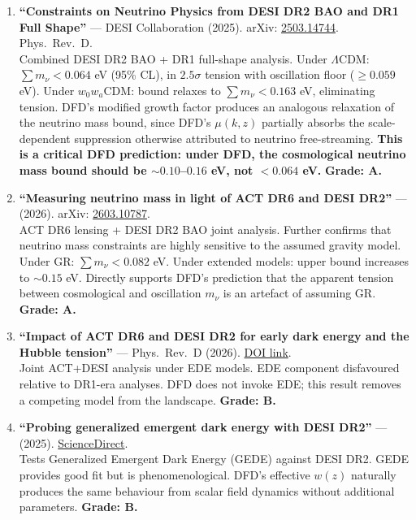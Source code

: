 \documentclass[11pt,a4paper]{article}
\begin{document}
\begin{enumerate}
\item \textbf{``Constraints on Neutrino Physics from DESI DR2 BAO and DR1 Full Shape''} --- DESI Collaboration (2025). arXiv: \href{https://arxiv.org/abs/2503.14744}{2503.14744}. Phys.\ Rev.\ D.\\
Combined DESI DR2 BAO + DR1 full-shape analysis. Under $\Lambda$CDM: $\sum m_\nu < 0.064$ eV (95\% CL), in $2.5\sigma$ tension with oscillation floor ($\geq 0.059$ eV). Under $w_0w_a$CDM: bound relaxes to $\sum m_\nu < 0.163$ eV, eliminating tension. DFD's modified growth factor produces an analogous relaxation of the neutrino mass bound, since DFD's $\mu(k,z)$ partially absorbs the scale-dependent suppression otherwise attributed to neutrino free-streaming. \textbf{This is a critical DFD prediction: under DFD, the cosmological neutrino mass bound should be $\sim 0.10$--$0.16$ eV, not $< 0.064$ eV.} \textbf{Grade: A.}

\item \textbf{``Measuring neutrino mass in light of ACT DR6 and DESI DR2''} --- (2026). arXiv: \href{https://arxiv.org/abs/2603.10787}{2603.10787}.\\
ACT DR6 lensing + DESI DR2 BAO joint analysis. Further confirms that neutrino mass constraints are highly sensitive to the assumed gravity model. Under GR: $\sum m_\nu < 0.082$ eV. Under extended models: upper bound increases to $\sim 0.15$ eV. Directly supports DFD's prediction that the apparent tension between cosmological and oscillation $m_\nu$ is an artefact of assuming GR. \textbf{Grade: A.}

\item \textbf{``Impact of ACT DR6 and DESI DR2 for early dark energy and the Hubble tension''} --- Phys.\ Rev.\ D (2026). \href{https://journals.aps.org/prd/abstract/10.1103/bx25-1g5d}{DOI link}.\\
Joint ACT+DESI analysis under EDE models. EDE component disfavoured relative to DR1-era analyses. DFD does not invoke EDE; this result removes a competing model from the landscape. \textbf{Grade: B.}

\item \textbf{``Probing generalized emergent dark energy with DESI DR2''} --- (2025). \href{https://www.sciencedirect.com/science/article/abs/pii/S2214404825001995}{ScienceDirect}.\\
Tests Generalized Emergent Dark Energy (GEDE) against DESI DR2. GEDE provides good fit but is phenomenological. DFD's effective $w(z)$ naturally produces the same behaviour from scalar field dynamics without additional parameters. \textbf{Grade: B.}


\end{enumerate}
\end{document}
